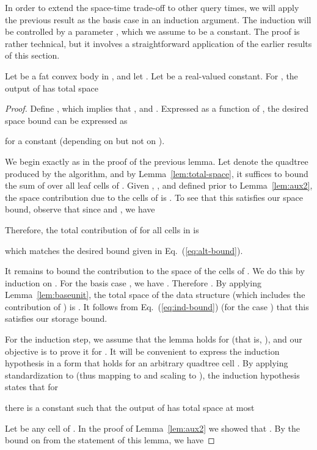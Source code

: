 \documentclass[11pt]{article}   \usepackage[letterpaper,hmargin=2.1cm,vmargin=3cm]{geometry}
\begin{document}
In order to extend the space-time trade-off to other query times, we will apply the previous result as the basis case in an induction argument. The induction will be controlled by a parameter , which we assume to be a constant. The proof is rather technical, but it involves a straightforward application of the earlier results of this section.

\begin{lemma} \label{lem:trade-off-ub}
Let  be a fat convex body in , and let . Let  be a real-valued constant. For , the output of  has total space

\end{lemma}


\begin{proof}
Define , which implies that , and . Expressed as a function of , the desired space bound can be expressed as

for a constant  (depending on  but not on ).

We begin exactly as in the proof of the previous lemma. Let  denote the quadtree produced by the algorithm, and by Lemma~\ref{lem:total-space}, it suffices to bound the sum of  over all leaf cells of . Given , , and  defined prior to Lemma~\ref{lem:aux2}, the space contribution due to the cells of  is . To see that this satisfies our space bound, observe that since  and , we have

Therefore, the total contribution of  for all cells in  is

which matches the desired bound given in Eq.~(\ref{eq:alt-bound}).

It remains to bound the contribution to the space of the cells of . We do this by induction on . For the basis case , we have . Therefore . By applying Lemma~\ref{lem:baseunit}, the total space of the data structure (which includes the contribution of ) is . It follows from Eq.~(\ref{eq:ind-bound}) (for the case ) that this satisfies our storage bound.

For the induction step, we assume that the lemma holds for  (that is, ), and our objective is to prove it for . It will be convenient to express the induction hypothesis in a form that holds for an arbitrary quadtree cell . By applying standardization to  (thus mapping  to  and scaling  to ), the induction hypothesis states that for

there is a constant  such that the output of  has total space at most


Let  be any cell of . In the proof of Lemma~\ref{lem:aux2} we showed that . By the bound on  from the statement of this lemma, we have


\end{proof}
\end{document}
